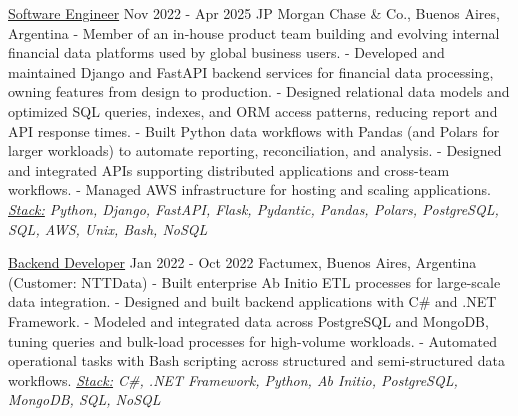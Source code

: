 \documentclass[a4paper]{ThirtyNinesecondscv}
\begin{document}
\begin{minipage}{\linewidth}
{\large\underline{Software Engineer}}  \hspace*{22pt} Nov 2022 - Apr 2025
\newline
JP Morgan Chase \& Co., Buenos Aires, Argentina
\newline- Member of an in-house product team building and evolving internal financial data platforms used by global business users.
\newline- Developed and maintained Django and FastAPI backend services for financial data processing, owning features from design to production.
\newline- Designed relational data models and optimized SQL queries, indexes, and ORM access patterns, reducing report and API response times.
\newline- Built Python data workflows with Pandas (and Polars for larger workloads) to automate reporting, reconciliation, and analysis.
\newline- Designed and integrated APIs supporting distributed applications and cross-team workflows.
\newline- Managed AWS infrastructure for hosting and scaling applications.
\newline\textit{\underline{Stack:} Python, Django, FastAPI, Flask, Pydantic, Pandas, Polars, PostgreSQL, SQL, AWS, Unix, Bash, NoSQL}
\end{minipage}
\par\vspace{6pt}

\begin{minipage}{\linewidth}
{\large\underline{Backend Developer}}  \hspace*{22pt} Jan 2022 - Oct 2022
\newline
Factumex, Buenos Aires, Argentina (Customer: NTTData)
\newline- Built enterprise Ab Initio ETL processes for large-scale data integration.
\newline- Designed and built backend applications with C\# and .NET Framework.
\newline- Modeled and integrated data across PostgreSQL and MongoDB, tuning queries and bulk-load processes for high-volume workloads.
\newline- Automated operational tasks with Bash scripting across structured and semi-structured data workflows.
\newline\textit{\underline{Stack:} C\#, .NET Framework, Python, Ab Initio, PostgreSQL, MongoDB, SQL, NoSQL}
\end{minipage}
\par\vspace{6pt}
\end{document}
